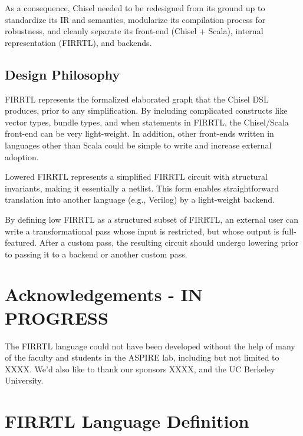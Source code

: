 \documentclass[12pt]{article}
\begin{document}
As a consequence, Chisel needed to be redesigned from its ground up to standardize its IR and semantics, modularize its compilation process for robustness, and cleanly separate its front-end (Chisel + Scala), internal representation (FIRRTL), and backends.

\subsection{Design Philosophy}
FIRRTL represents the formalized elaborated graph that the Chisel DSL produces, prior to any simplification.
By including complicated constructs like vector types, bundle types, and when statements in FIRRTL, the Chisel/Scala front-end can be very light-weight.
In addition, other front-ends written in languages other than Scala could be simple to write and increase external adoption.

Lowered FIRRTL represents a simplified FIRRTL circuit with structural invariants, making it essentially a netlist.
This form enables straightforward translation into another language (e.g., Verilog) by a light-weight backend.

By defining low FIRRTL as a structured subset of FIRRTL, an external user can write a transformational pass whose input is restricted, but whose output is full-featured.
After a custom pass, the resulting circuit should undergo lowering prior to passing it to a backend or another custom pass.

\section{Acknowledgements - IN PROGRESS}
The FIRRTL language could not have been developed without the help of many of the faculty and students in the ASPIRE lab, including but not limited to XXXX.
We'd also like to thank our sponsors XXXX, and the UC Berkeley University.

\section{FIRRTL Language Definition}
\end{document}
